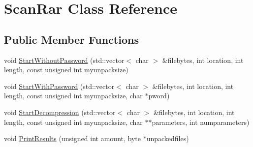 \hypertarget{class_scan_rar}{\section{Scan\-Rar Class Reference}
\label{class_scan_rar}
}
\subsection*{Public Member Functions}
\begin{DoxyCompactItemize}
\item 
void \hyperlink{class_scan_rar_ab1173860c67e3ce1ccb43834e63ae592}{Start\-Without\-Password} (std\-::vector$<$ char $>$ \&filebytes, int location, int length, const unsigned int myunpacksize)
\item 
void \hyperlink{class_scan_rar_adb319adfbd7d37b0f8417b8eb31dc265}{Start\-With\-Password} (std\-::vector$<$ char $>$ \&filebytes, int location, int length, const unsigned int myunpacksize, char $\ast$pword)
\item 
void \hyperlink{class_scan_rar_adbae11e6aa128e779ef7493836b5aedb}{Start\-Decompression} (std\-::vector$<$ char $>$ \&filebytes, int location, int length, const unsigned int myunpacksize, char $\ast$$\ast$parameters, int numparameters)
\item 
void \hyperlink{class_scan_rar_a08c437e40d6f3fff77341759aa1c3ff1}{Print\-Results} (unsigned int amount, byte $\ast$unpackedfiles)
\end{DoxyCompactItemize}


